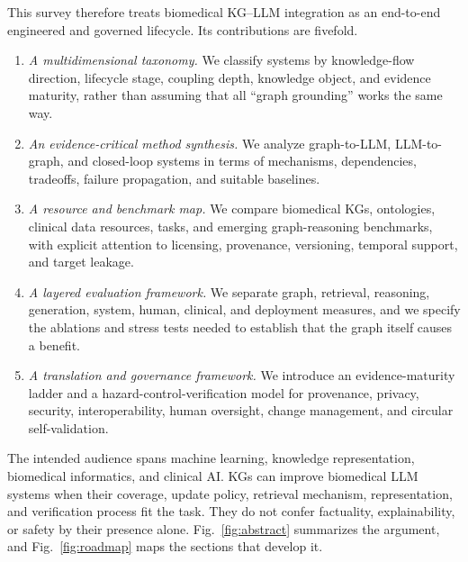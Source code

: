 This survey therefore treats biomedical KG--LLM integration as an end-to-end engineered and governed lifecycle. Its contributions are fivefold.

\begin{enumerate}
\item \emph{A multidimensional taxonomy.} We classify systems by knowledge-flow direction, lifecycle stage, coupling depth, knowledge object, and evidence maturity, rather than assuming that all ``graph grounding'' works the same way.
\item \emph{An evidence-critical method synthesis.} We analyze graph-to-LLM, LLM-to-graph, and closed-loop systems in terms of mechanisms, dependencies, tradeoffs, failure propagation, and suitable baselines.
\item \emph{A resource and benchmark map.} We compare biomedical KGs, ontologies, clinical data resources, tasks, and emerging graph-reasoning benchmarks, with explicit attention to licensing, provenance, versioning, temporal support, and target leakage.
\item \emph{A layered evaluation framework.} We separate graph, retrieval, reasoning, generation, system, human, clinical, and deployment measures, and we specify the ablations and stress tests needed to establish that the graph itself causes a benefit.
\item \emph{A translation and governance framework.} We introduce an evidence-maturity ladder and a hazard-control-verification model for provenance, privacy, security, interoperability, human oversight, change management, and circular self-validation.
\end{enumerate}

The intended audience spans machine learning, knowledge representation, biomedical informatics, and clinical AI. KGs can improve biomedical LLM systems when their coverage, update policy, retrieval mechanism, representation, and verification process fit the task. They do not confer factuality, explainability, or safety by their presence alone. Fig.~\ref{fig:abstract} summarizes the argument, and Fig.~\ref{fig:roadmap} maps the sections that develop it.



